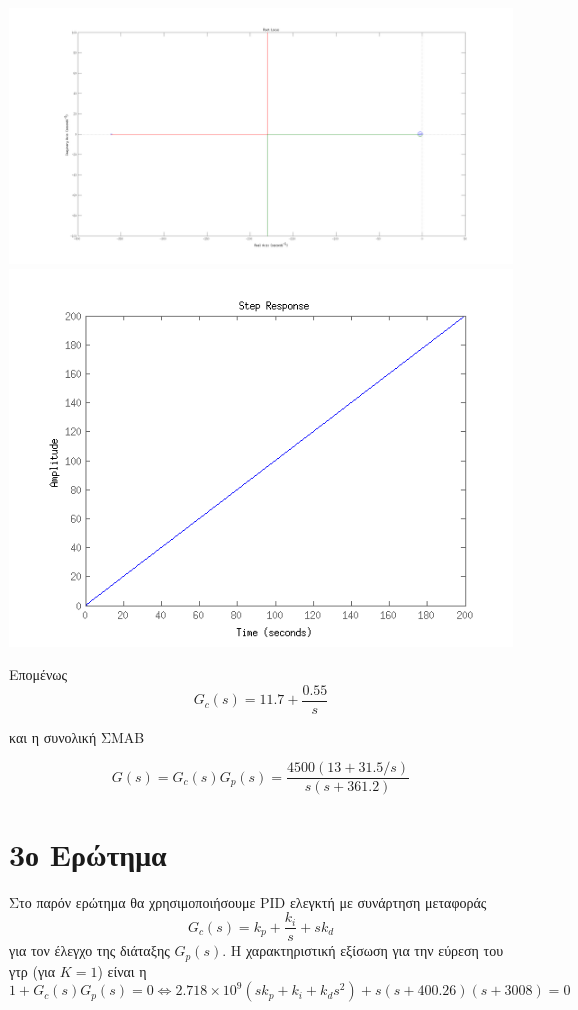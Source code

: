 \documentclass[a4paper,oneside, 10pt]{article}
\begin{document}
 \includegraphics[width=\textwidth]{pi_rlocus.png}
 \includegraphics[width=\textwidth]{step2.png}

Επομένως $$G_c(s) = 11.7 + \frac {0.55} s$$

και η συνολική ΣΜΑΒ

$$G(s) = G_c(s) G_p(s) = \frac {4500(13 + 31.5 / s)}  {s (s + 361.2)}$$



\section*{3ο Ερώτημα} 

Στο παρόν ερώτημα θα χρησιμοποιήσουμε PID ελεγκτή με συνάρτηση μεταφοράς $$G_c(s) = k_p + \frac {k_i} s + s k_d$$ για τον έλεγχο της διάταξης $G_p(s)$. Η χαρακτηριστική εξίσωση για την εύρεση του γτρ (για $K = 1$) είναι η $$1 + G_c(s) G_p(s) = 0 \iff 2.718 \times 10^9 (s k_p + k_i + k_d s^2) + s (s + 400.26) (s + 3008) = 0$$
\end{document}
